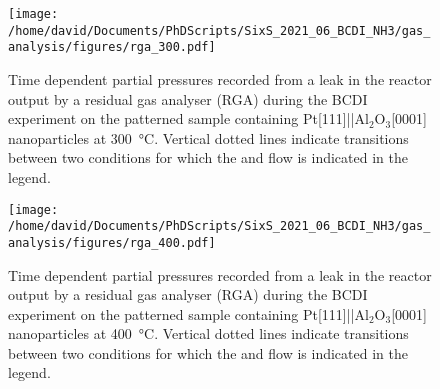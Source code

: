 \begin{figure}[!htb]
    \centering
    \texttt{[image: /home/david/Documents/PhDScripts/SixS\_2021\_06\_BCDI\_NH3/gas\_analysis/figures/rga\_300.pdf]}
    \caption{
        Time dependent partial pressures recorded from a leak in the reactor output by a residual gas analyser (RGA) during the BCDI experiment on the patterned sample containing Pt[111]||Al$_2$O$_3$[0001] nanoparticles at \qty{300}{\degreeCelsius}.
        Vertical dotted lines indicate transitions between two conditions for which the  and  flow is indicated in the legend.
    }
    \label{fig:RGA300BCDINanoparticles}
\end{figure}

\begin{figure}[!htb]
    \centering
    \texttt{[image: /home/david/Documents/PhDScripts/SixS\_2021\_06\_BCDI\_NH3/gas\_analysis/figures/rga\_400.pdf]}
    \caption{
        Time dependent partial pressures recorded from a leak in the reactor output by a residual gas analyser (RGA) during the BCDI experiment on the patterned sample containing Pt[111]||Al$_2$O$_3$[0001] nanoparticles at \qty{400}{\degreeCelsius}.
        Vertical dotted lines indicate transitions between two conditions for which the  and  flow is indicated in the legend.
    }
    \label{fig:RGA400BCDINanoparticles}
\end{figure}
